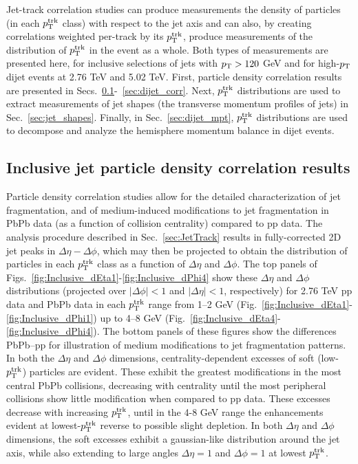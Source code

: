 

Jet-track correlation studies can produce measurements the density of particles (in each $p_{\rm T}^{\rm trk}$ class) with respect to the jet axis and can also, by creating correlations weighted per-track by its $p_{\rm T}^{\rm trk}$, produce measurements of the distribution of $p_{\rm T}^{\rm trk}$ in the event as a whole.  Both types of measurements are presented here, for inclusive selections of jets with $p_{\rm T} > 120$ GeV and for high-$p_{\rm T}$ dijet events at 2.76 TeV and 5.02 TeV.  First, particle density correlation results are presented in Secs.~\ref{sec:inc_corr}-~\ref{sec:dijet_corr}.  Next, $p_{\rm T}^{\rm trk}$ distributions are used to extract measurements of jet shapes (the transverse momentum profiles of jets) in Sec.~\ref{sec:jet_shapes}.  Finally, in Sec.~\ref{sec:dijet_mpt}, $p_{\rm T}^{\rm trk}$ distributions are used to decompose and analyze the hemisphere momentum balance in dijet events.

\subsection{Inclusive jet particle density correlation results}
\label{sec:inc_corr}


Particle density correlation studies allow for the detailed characterization of jet fragmentation, and of medium-induced modifications to jet fragmentation in PbPb data (as a function of collision centrality) compared to pp data.  The analysis procedure described in Sec.~\ref{sec:JetTrack} results in fully-corrected 2D jet peaks in $\Delta\eta-\Delta\phi$, which may then be projected to obtain the distribution of particles in each $p_{\rm T}^{\rm trk}$ class as a function of $\Delta\eta$ and $\Delta\phi$.  The top panels of Figs.~\ref{fig:Inclusive_dEta1}-\ref{fig:Inclusive_dPhi4} show these $\Delta\eta$ and $\Delta\phi$ distributions (projected over $|\Delta\phi| < 1$ and $|\Delta\eta| < 1$, respectively) for 2.76 TeV pp data and PbPb data in each $p_{\rm T}^{\rm trk}$ range from 1--2 GeV (Fig.~\ref{fig:Inclusive_dEta1}-\ref{fig:Inclusive_dPhi1}) up to 4--8 GeV (Fig.~\ref{fig:Inclusive_dEta4}-\ref{fig:Inclusive_dPhi4}).  The bottom panels of these figures show the differences PbPb--pp for illustration of medium modifications to jet fragmentation patterns.  In both the $\Delta\eta$ and $\Delta\phi$ dimensions, centrality-dependent excesses of soft (low-$p_{\rm T}^{\rm trk}$) particles are evident.  These exhibit the greatest modifications in the most central PbPb collisions, decreasing with centrality until the most peripheral collisions show little modification when compared to pp data.  These excesses decrease with increasing $p_{\rm T}^{\rm trk}$, until in the 4-8 GeV range the enhancements evident at lowest-$p_{\rm T}^{\rm trk}$ reverse to possible slight depletion.  In both $\Delta\eta$ and $\Delta\phi$ dimensions, the soft excesses exhibit a gaussian-like distribution around the jet axis, while also extending to large angles $\Delta\eta = 1$ and $\Delta\phi = 1$ at lowest $p_{\rm T}^{\rm trk}$.  

